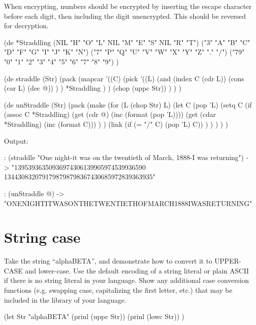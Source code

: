 When encrypting, numbers should be encrypted by inserting the escape
character before each digit, then including the digit unencrypted. This
should be reversed for decryption.

\begin{wideverbatim}

(de *Straddling
   (NIL  "H"  "O"  "L"  NIL  "M"  "E"  "S"  NIL  "R"  "T")
   ("3"  "A"  "B"  "C"  "D"  "F"  "G"  "I"  "J"  "K"  "N")
   ("7"  "P"  "Q"  "U"  "V"  "W"  "X"  "Y"  "Z"  "."  "/")
   ("79" "0"  "1"  "2"  "3"  "4"  "5"  "6"  "7"  "8"  "9") )

(de straddle (Str)
   (pack
      (mapcar
         '((C)
            (pick
               '((L)
                  (and
                     (index C (cdr L))
                     (cons (car L) (dec @)) ) )
               *Straddling ) )
         (chop (uppc Str)) ) ) )

(de unStraddle (Str)
   (pack
      (make
         (for (L (chop Str)  L)
            (let C (pop 'L)
               (setq C
                  (if (assoc C *Straddling)
                     (get (cdr @) (inc (format (pop 'L))))
                     (get (cdar *Straddling) (inc (format C))) ) )
               (link (if (= "/" C) (pop 'L) C)) ) ) ) ) )

Output:

: (straddle "One night-it was on the twentieth of March, 1888-I was returning")
-> "13953936350936974306139905974539936590
    1344308320791798798798367430685972839363935"

: (unStraddle @)
-> "ONENIGHTITWASONTHETWENTIETHOFMARCH1888IWASRETURNING"

\end{wideverbatim}

\pagebreak{}
\section*{String case}

Take the string ``alphaBETA'', and demonstrate how to convert it to
UPPER-CASE and lower-case. Use the default encoding of a string literal
or plain ASCII if there is no string literal in your language. Show any
additional case conversion functions (e.g. swapping case, capitalizing
the first letter, etc.) that may be included in the library of your
language.


\begin{wideverbatim}

(let Str "alphaBETA"
   (prinl (uppc Str))
   (prinl (lowc Str)) )

\end{wideverbatim}

